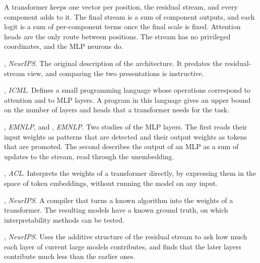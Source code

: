 \begin{takeaways}
A transformer keeps one vector per position, the residual stream, and every component adds to it. The final
stream is a sum of component outputs, and each logit is a sum of per-component terms once the final scale is
fixed. Attention heads are the only route between positions. The stream has no privileged coordinates, and the
MLP neurons do.
\end{takeaways}

\begin{readinglist}
\item \citet{vaswani2017attention}, \emph{NeurIPS}. The original description of the architecture. It predates the
residual-stream view, and comparing the two presentations is instructive.
\item \citet{weiss2021thinking}, \emph{ICML}. Defines a small programming language whose operations correspond to
attention and to MLP layers. A program in this language gives an upper bound on the number of layers and heads that a
transformer needs for the task.
\item \citet{geva2021transformer}, \emph{EMNLP}, and \citet{geva2022transformer}, \emph{EMNLP}. Two studies of the
MLP layers. The first reads their input weights as patterns that are detected and their output weights as tokens
that are promoted. The second describes the output of an MLP as a sum of updates to the stream, read through the
unembedding.
\item \citet{dar2023analyzing}, \emph{ACL}. Interprets the weights of a transformer directly, by expressing them
in the space of token embeddings, without running the model on any input.
\item \citet{lindner2023tracr}, \emph{NeurIPS}. A compiler that turns a known algorithm into the weights of a
transformer. The resulting models have a known ground truth, on which interpretability methods can be tested.
\item \citet{csordas2025language}, \emph{NeurIPS}. Uses the additive structure of the residual stream to ask how
much each layer of current large models contributes, and finds that the later layers contribute much less than
the earlier ones.
\end{readinglist}
